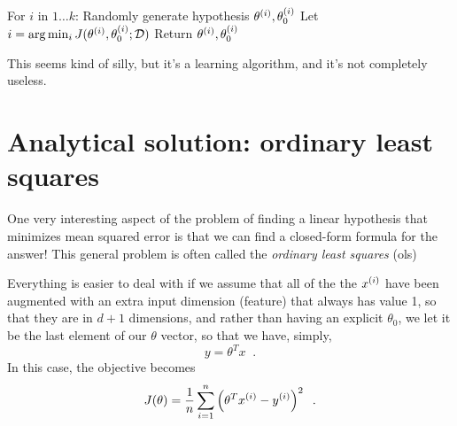 \begin{codebox}
  \li For $i$ in  $1\dots k$: Randomly generate hypothesis $\theta^{(i)},
    \theta_0^{(i)}$
  \li Let $i = {\rm arg}\min_{i} J(\theta^{(i)}, \theta_0^{(i)}; {\cal D})$
  \li Return $\theta^{(i)}, \theta_0^{(i)}$
\end{codebox}

This seems kind of silly, but it's a learning algorithm, and it's not
completely useless. 


\section{Analytical solution: ordinary least squares}

One very interesting aspect of the problem of finding a linear hypothesis
that minimizes mean squared error is that we can find a
closed-form formula for the answer! This general problem is often
called the {\em ordinary least squares} ({\sc ols})

Everything is easier to deal with if we assume that all of the the $x^{(i)}$
have been augmented with an extra input dimension (feature) that
always has value 1, so that they are in $d+1$ dimensions, and rather
than having an explicit $\theta_0$, we let it be the last element of
our $\theta$ vector, so that we have, simply,
\[y = \theta^T x\;\;.\]
In this case, the objective becomes
\begin{equation}
  J(\theta) = \frac{1}{n}\sum_{i =
    1}^n\left(\theta^Tx^{(i)} - y^{(i)}\right)^2 \;\;.
  \label{eq:reg_mse}
\end{equation}


